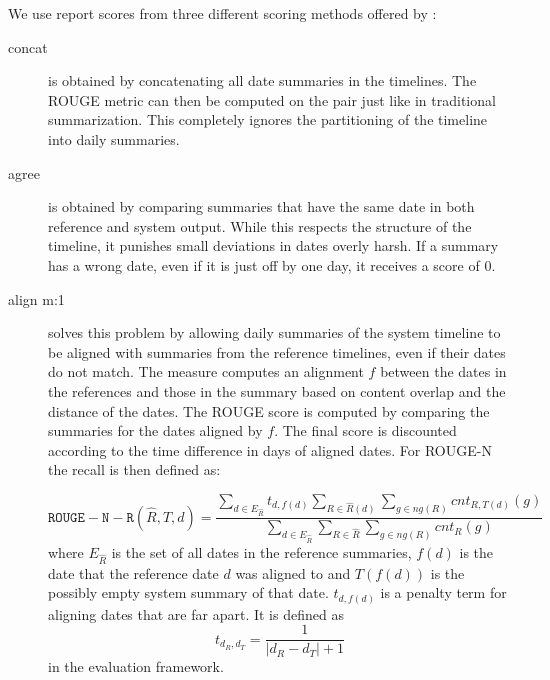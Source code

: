 \documentclass[a4paper,BCOR=10mm]{report}
\numberwithin{lemma}{chapter}
\numberwithin{definition}{chapter}
\begin{document}
We use report scores from three different scoring methods offered by \citet{tilse}:
\begin{description}
\item[concat] {is obtained by concatenating all date summaries in the timelines. The ROUGE metric can then be computed on the pair just like in traditional summarization.
This completely ignores the partitioning of the timeline into daily summaries.}
\item[agree] {is obtained by comparing summaries that have the same date in both reference and system output. While this respects the structure of the timeline, it punishes small deviations in dates overly harsh. If a summary has a wrong date, even if it is just off by one day, it receives a score of $0$.}
\item[align m:1] {solves this problem by allowing daily summaries of the system timeline to be aligned with summaries from the reference timelines, even if their dates do not match. The measure computes an alignment $f$ between the dates in the references and those in the summary based on content overlap and the distance of the dates. The ROUGE score is computed by comparing the summaries for the dates aligned by $f$.
The final score is discounted according to the time difference in days of aligned dates. For ROUGE-N the recall is then defined as:

\begin{equation}
    \mathtt{ROUGE-N-R}(\hat{R}, T, d) =  \frac{
        \sum_{d \in E_{\hat{R}}} t_{d, f(d)}
        \sum_{R \in \hat{R}(d)}
        \sum_{g \in \mathit{ng}(R)}
        \mathit{cnt}_{R,T(d)}(g)
    }{
        \sum_{d \in E_{\hat{R}}}
        \sum_{R \in \hat{R}}
        \sum_{g \in \mathit{ng}(R)}
        \mathit{cnt}_R(g)
    }
\end{equation}
where $E_{\hat{R}}$ is the set of all dates in the reference summaries,
$f(d)$ is the date that the reference date $d$ was aligned to and $T(f(d))$ is the possibly empty system summary of that date.
$t_{d,f(d)}$ is a penalty term for aligning dates that are far apart.
It is defined as
\begin{equation}
t_{d_R, d_T} = \frac{1}{|d_R - d_T| + 1}
\end{equation}
in the evaluation framework.


 }
\end{description}
\end{document}

